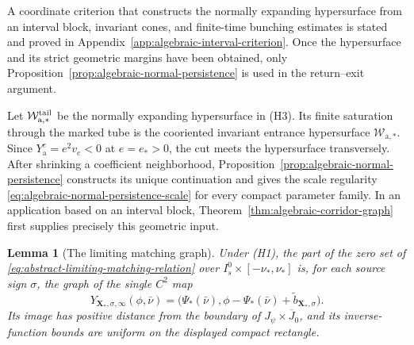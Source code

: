 \documentclass[11pt]{amsart}
\numberwithin{equation}{section}
\newtheorem{lemma}[theorem]{Lemma}
\theoremstyle{definition}
\theoremstyle{remark}
\begin{document}
A coordinate criterion that constructs the normally expanding
hypersurface from an interval block, invariant cones, and finite-time
bunching estimates is stated and proved in
Appendix~\ref{app:algebraic-interval-criterion}.  Once the hypersurface
and its strict geometric margins have been obtained, only
Proposition~\ref{prop:algebraic-normal-persistence} is used in the
return--exit argument.

Let $\mathcal W_{\mathrm a,*}^{\rm tail}$ be the normally expanding
hypersurface in \textup{(H3)}.  Its finite saturation through the marked
tube is the cooriented invariant entrance hypersurface
$\mathcal W_{\mathrm a,*}$.  Since
$Y_{\mathrm a}^e=e^2v_e<0$ at $e=e_*>0$, the cut meets the hypersurface
transversely.  After shrinking a coefficient neighborhood,
Proposition~\ref{prop:algebraic-normal-persistence} constructs its unique
continuation and gives the scale regularity
\eqref{eq:algebraic-normal-persistence-scale} for every compact parameter
family.  In an application based on an interval block,
Theorem~\ref{thm:algebraic-corridor-graph} first supplies precisely this
geometric input.

\begin{lemma}[The limiting matching graph]
\label{lem:h1-matching-graph}
Under \textup{(H1)}, the part of the zero set of
\eqref{eq:abstract-limiting-matching-relation} over
$I_s^0\times[-\nu_*,\nu_*]$ is, for each source sign $\sigma$, the graph
of the single $C^2$ map
\begin{equation}\label{eq:derived-limiting-matching-graph}
 Y_{\mathbf X_*,\sigma,\infty}(\phi,\bar\nu)
 =\bigl(\Psi_*(\bar\nu),
        \phi-\Psi_*(\bar\nu)+\widetilde b_{\mathbf X_*,\sigma}\bigr).
\end{equation}
Its image has positive distance from the boundary of
$J_\psi\times\overline J_0$, and its inverse-function bounds are uniform
on the displayed compact rectangle.
\end{lemma}
\end{document}
